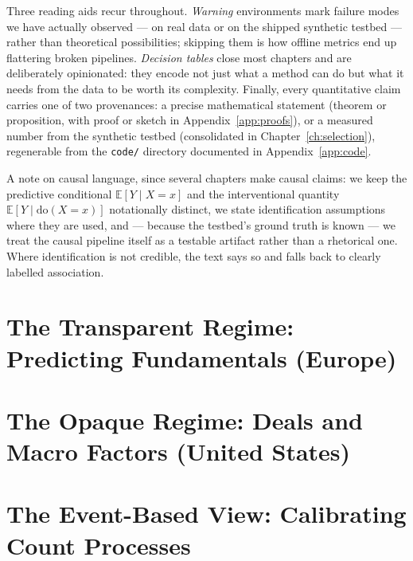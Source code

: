 \documentclass[11pt,a4paper]{report}
\theoremstyle{plain}
\theoremstyle{definition}
\theoremstyle{remark}
\newcommand{\E}{\mathbb{E}}
\newcommand{\Do}{\mathrm{do}}
\begin{document}
Three reading aids recur throughout. \emph{Warning} environments mark failure modes we
have actually observed --- on real data or on the shipped synthetic testbed --- rather than
theoretical possibilities; skipping them is how offline metrics end up flattering broken
pipelines. \emph{Decision tables} close most chapters and are deliberately opinionated:
they encode not just what a method can do but what it needs from the data to be worth its
complexity. Finally, every quantitative claim carries one of two provenances: a precise
mathematical statement (theorem or proposition, with proof or sketch in
Appendix~\ref{app:proofs}), or a measured number from the synthetic testbed
(consolidated in Chapter~\ref{ch:selection}), regenerable from the \texttt{code/}
directory documented in Appendix~\ref{app:code}.

A note on causal language, since several chapters make causal claims: we keep the
predictive conditional $\E[Y \mid X{=}x]$ and the interventional quantity
$\E[Y \mid \Do(X{=}x)]$ notationally distinct, we state identification assumptions where
they are used, and --- because the testbed's ground truth is known --- we treat the causal
pipeline itself as a testable artifact rather than a rhetorical one. Where identification
is not credible, the text says so and falls back to clearly labelled association.



\part{The Transparent Regime: Predicting Fundamentals (Europe)}





\part{The Opaque Regime: Deals and Macro Factors (United States)}


\part{The Event-Based View: Calibrating Count Processes}






\appendix



\end{document}
